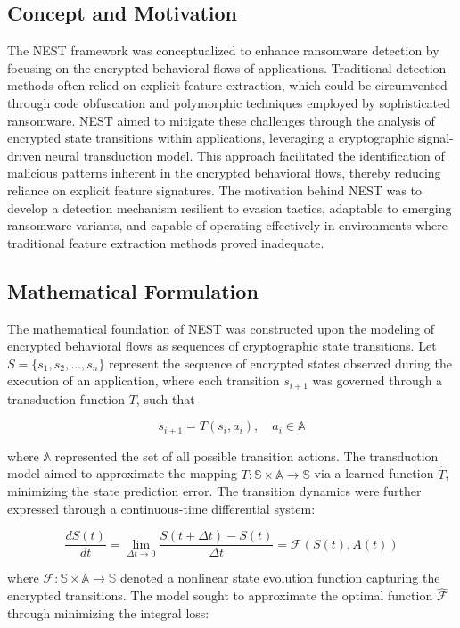 \documentclass[lettersize,journal]{IEEEtran}
\begin{document}
\subsection{Concept and Motivation}

The NEST framework was conceptualized to enhance ransomware detection by focusing on the encrypted behavioral flows of applications. Traditional detection methods often relied on explicit feature extraction, which could be circumvented through code obfuscation and polymorphic techniques employed by sophisticated ransomware. NEST aimed to mitigate these challenges through the analysis of encrypted state transitions within applications, leveraging a cryptographic signal-driven neural transduction model. This approach facilitated the identification of malicious patterns inherent in the encrypted behavioral flows, thereby reducing reliance on explicit feature signatures. The motivation behind NEST was to develop a detection mechanism resilient to evasion tactics, adaptable to emerging ransomware variants, and capable of operating effectively in environments where traditional feature extraction methods proved inadequate.

\subsection{Mathematical Formulation}

The mathematical foundation of NEST was constructed upon the modeling of encrypted behavioral flows as sequences of cryptographic state transitions. Let \( S = \{s_1, s_2, ..., s_n\} \) represent the sequence of encrypted states observed during the execution of an application, where each transition \( s_{i+1} \) was governed through a transduction function \( T \), such that

\[
s_{i+1} = T(s_i, a_i), \quad a_i \in \mathbb{A}
\]

where \( \mathbb{A} \) represented the set of all possible transition actions. The transduction model aimed to approximate the mapping \( T: \mathbb{S} \times \mathbb{A} \to \mathbb{S} \) via a learned function \( \hat{T} \), minimizing the state prediction error. The transition dynamics were further expressed through a continuous-time differential system:

\[
\frac{dS(t)}{dt} = \lim_{\Delta t \to 0} \frac{S(t+\Delta t) - S(t)}{\Delta t} = \mathcal{F}(S(t), A(t))
\]

where \( \mathcal{F}: \mathbb{S} \times \mathbb{A} \to \mathbb{S} \) denoted a nonlinear state evolution function capturing the encrypted transitions. The model sought to approximate the optimal function \( \hat{\mathcal{F}} \) through minimizing the integral loss:
\end{document}
